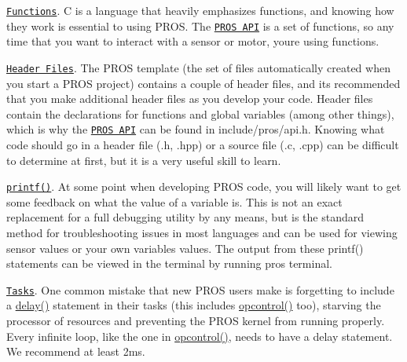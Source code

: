 \begin{DoxyItemize}
\item \href{http://www.studytonight.com/c/user-defined-functions-in-c.php}{\tt Functions}. C is a language that heavily emphasizes functions, and knowing how they work is essential to using P\+R\+OS. The \href{../api/index.html}{\tt P\+R\+OS A\+PI} is a set of functions, so any time that you want to interact with a sensor or motor, you\textquotesingle{}re using functions.
\item \href{https://www.tutorialspoint.com/cprogramming/c_header_files.htm}{\tt Header Files}. The P\+R\+OS template (the set of files automatically created when you start a P\+R\+OS project) contains a couple of header files, and it\textquotesingle{}s recommended that you make additional header files as you develop your code. Header files contain the declarations for functions and global variables (among other things), which is why the \href{../api/index.html}{\tt P\+R\+OS A\+PI} can be found in {\ttfamily include/pros/api.\+h}. Knowing what code should go in a header file ({\ttfamily .h}, {\ttfamily .hpp}) or a source file ({\ttfamily .c}, {\ttfamily .cpp}) can be difficult to determine at first, but it is a very useful skill to learn.
\item \href{https://www.codingunit.com/printf-format-specifiers-format-conversions-and-formatted-output}{\tt printf()}. At some point when developing P\+R\+OS code, you will likely want to get some feedback on what the value of a variable is. This is not an exact replacement for a full debugging utility by any means, but is the standard method for troubleshooting issues in most languages and can be used for viewing sensor values or your own variables\textquotesingle{} values. The output from these {\ttfamily printf()} statements can be viewed in the terminal by running {\ttfamily pros terminal}.
\item \href{../tutorials/topical/multitasking.html}{\tt Tasks}. One common mistake that new P\+R\+OS users make is forgetting to include a {\ttfamily \hyperlink{rtos_8h_ab8c5a8048d5576a33d7f79b95a2fa0dd}{delay()}} statement in their tasks (this includes {\ttfamily \hyperlink{main_8h_a1903abdb5ef0f301d660754c8315fc17}{opcontrol()}} too), starving the processor of resources and preventing the P\+R\+OS kernel from running properly. Every infinite loop, like the one in {\ttfamily \hyperlink{main_8h_a1903abdb5ef0f301d660754c8315fc17}{opcontrol()}}, needs to have a delay statement. We recommend at least 2ms.
\end{DoxyItemize}

